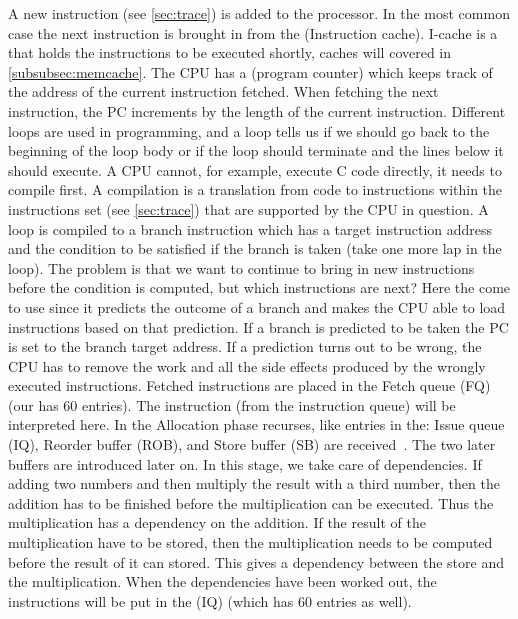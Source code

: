  A new instruction (see \ref{sec:trace}) is added to the processor. In the most common case the next instruction is brought in from the  (Instruction cache). I-cache is a  that holds the instructions to be executed shortly, caches will covered in \ref{subsubsec:memcache}. The CPU has a  (program counter) which keeps track of the address of the current instruction fetched. When fetching the next instruction, the PC increments by the length of the current instruction. Different loops are used in programming, and a loop tells us if we should go back to the beginning of the loop body or if the loop should terminate and the lines below it should execute. A CPU cannot, for example, execute C code directly, it needs to compile first. A compilation is a translation from code to instructions within the instructions set (see \ref{sec:trace}) that are supported by the CPU in question. A loop is compiled to a branch instruction which has a target instruction
address
and the condition to be satisfied if the branch is taken (take one more lap in the
loop). The problem is that we want to continue to bring in new instructions before
the condition is computed, but which instructions are next? Here
the  come to use since it predicts the outcome of a branch and makes the CPU able to load instructions based on that prediction. If a branch is predicted to be taken the PC is set to the branch target address. If a prediction turns out to be wrong, the CPU has to remove the work and all the side effects produced by the wrongly executed instructions. Fetched instructions are placed in the Fetch queue (FQ) (our has 60 entries).
 The instruction (from the instruction queue) will be interpreted here. In the Allocation phase recurses, like entries in the: Issue queue (IQ), Reorder buffer (ROB), and Store buffer (SB) are received~\cite{CPUbook}. The two later buffers are introduced later on.
 In this stage, we take care of dependencies. If adding two numbers and then multiply the result with a third number, then the addition has to be finished before the multiplication can be executed. Thus the multiplication has a dependency on the addition. If the result of the multiplication have to be stored, then the multiplication needs to be computed before the result of it can stored. This gives a dependency between the store and the multiplication. When the dependencies have been worked out, the instructions will be put in the  (IQ) (which has 60 entries as well).

